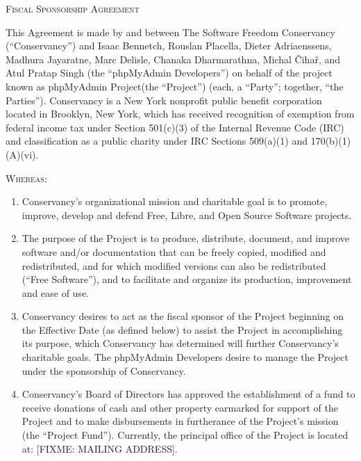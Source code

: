\documentclass[letterpaper,11pt]{article}
\newcommand{\projectname}{phpMyAdmin Project\xspace}
\newcommand{\signatories}{phpMyAdmin Developers\xspace}
\begin{document}
\begin{center}
\textsc{\Huge Fiscal Sponsorship Agreement}{\Huge {} } 
\par\end{center}

\bigskip{}


This Agreement is made by and between The Software Freedom Conservancy
(``Conservancy'') and 
Isaac Bennetch,
Rouslan Placella,
Dieter Adriaenssens,
Madhura Jayaratne,
Marc Delisle,
Chanaka Dharmarathna,
Michal Čihař, and
Atul Pratap Singh
(the ``\signatories'')
on behalf of the project known as \projectname (the ``Project'') (each, a 
``Party''; together, ``the Parties'').  Conservancy is a New York nonprofit 
public benefit corporation located in Brooklyn, New York, which has received 
recognition of exemption from federal income tax under Section 501(c)(3) of 
the Internal Revenue Code (IRC) and classification as a public charity under 
IRC Sections 509(a)(1) and 170(b)(1)(A)(vi).

\textsc{Whereas:}

\begin{enumerate}[label=\Alph*.,ref=\S \Alph*]
\item Conservancy's organizational mission and charitable goal is to promote,
improve, develop and defend Free, Libre, and Open Source Software
projects. 
\item The purpose of the Project is to produce, distribute, document, and
improve software and/or documentation that can be freely copied, modified and redistributed,
and for which modified versions can also be redistributed (``Free Software''),
and to facilitate and organize its production, improvement and ease
of use. 
\item Conservancy desires to act as the fiscal sponsor of the Project beginning
on the Effective Date (as defined below) to assist the Project in
accomplishing its purpose, which Conservancy has determined will further
Conservancy's charitable goals. The \signatories desire to manage
the Project under the sponsorship of Conservancy. 
\item Conservancy's Board of Directors has approved the establishment
of a fund to receive donations of cash and other property earmarked
for support of the Project and to make disbursements in furtherance
of the Project's mission (the ``Project Fund''). Currently, the
principal office of the Project is located at: [FIXME: MAILING ADDRESS]. 
\end{enumerate}
\medskip{}
\end{document}
